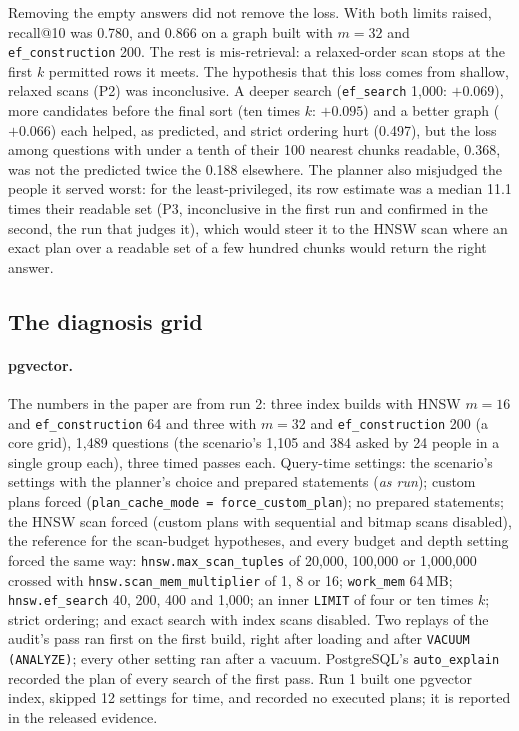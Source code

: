 Removing the empty answers did not remove the loss. With both limits raised, recall@10 was 0.780,
and 0.866 on a graph built with $m = 32$ and \texttt{ef\_construction} 200. The rest is
mis-retrieval: a relaxed-order scan stops at the first $k$ permitted rows it meets. The hypothesis
that this loss comes from shallow, relaxed scans (P2) was inconclusive. A deeper search
(\texttt{ef\_search} 1,000: $+0.069$), more candidates before the final sort (ten times $k$: $+0.095$)
and a better graph ($+0.066$) each helped, as predicted, and strict ordering hurt (0.497), but the
loss among questions with under a tenth of their 100 nearest chunks readable, 0.368, was not the
predicted twice the 0.188 elsewhere. The planner also
misjudged the people it served worst: for the least-privileged, its row estimate was a median 11.1
times their readable set (P3, inconclusive in the first run and confirmed in the second, the run that judges it), which would steer it to the HNSW scan where an exact plan over
a readable set of a few hundred chunks would return the right answer.

\subsection{The diagnosis grid}\label{app:x1grid}

\paragraph{pgvector.} The numbers in the paper are from run 2: three index builds with HNSW $m = 16$
and \texttt{ef\_construction} 64 and three with $m = 32$ and \texttt{ef\_construction} 200 (a core
grid), 1,489 questions (the scenario's 1,105 and 384 asked by 24 people in a single group each),
three timed passes each. Query-time settings: the scenario's settings with the planner's choice and
prepared statements (\emph{as run}); custom plans forced (\texttt{plan\_cache\_mode =
force\_custom\_plan}); no prepared statements; the HNSW scan forced (custom plans with sequential
and bitmap scans disabled), the reference for the scan-budget hypotheses, and every budget and depth
setting forced the same way: \texttt{hnsw.max\_scan\_tuples} of 20,000, 100,000 or 1,000,000 crossed
with \texttt{hnsw.scan\_mem\_multiplier} of 1, 8 or 16; \texttt{work\_mem} 64\,MB;
\texttt{hnsw.ef\_search} 40, 200, 400 and 1,000; an inner \texttt{LIMIT} of four or ten times $k$;
strict ordering; and exact search with index scans disabled. Two replays of the audit's pass ran
first on the first build, right after loading and after \texttt{VACUUM (ANALYZE)}; every other
setting ran after a vacuum. PostgreSQL's \texttt{auto\_explain} recorded the plan of every search of
the first pass. Run 1 built one pgvector index, skipped 12 settings for time, and recorded no
executed plans; it is reported in the released evidence.


